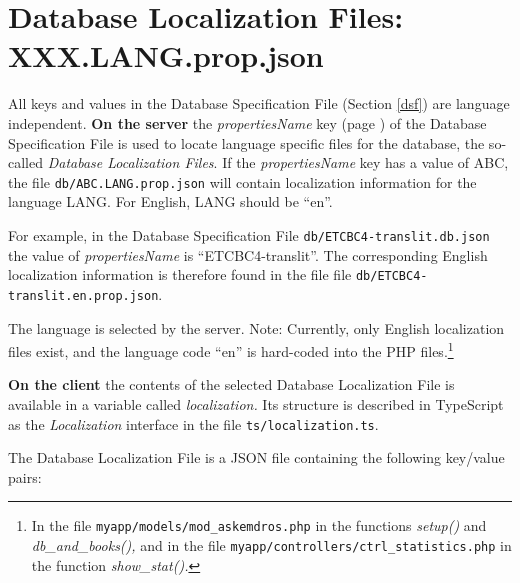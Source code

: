 \documentclass[11pt,oneside,a4paper]{memoir}
\begin{document}
\section{Database Localization Files: XXX.LANG.prop.json}\label{db-local}

All keys and values in the Database Specification File (Section \ref{dsf}) are language
independent. \textbf{On the server} the \emph{propertiesName} key (page \pageref{propname}) of the
Database Specification File is used to locate language specific files for the database, the
so-called \emph{Database Localization Files}. If the \emph{propertiesName} key has a value of ABC,
the file \texttt{db/ABC.LANG.prop.json} will contain localization information for the language LANG.
For English, LANG should be ``en''.

For example, in the Database Specification File \texttt{db/ETCBC4-translit.db.json} the value of
\emph{propertiesName} is ``ETCBC4-translit''. The corresponding English localization information is
therefore found in the file file \texttt{db/ETCBC4-translit.en.prop.json}.

The language is selected by the server. Note: Currently, only English localization files exist, and
the language code ``en'' is hard-coded into the PHP files.\footnote{In the file
  \texttt{myapp/models/mod\_askemdros.php} in the functions \emph{setup()} and
  \emph{db\_and\_books(),} and in the file \texttt{myapp/controllers/ctrl\_statistics.php} in the
  function \emph{show\_stat().}}

\textbf{On the client} the contents of the selected Database Localization File is available in a
variable called \emph{localization.} Its structure is described in TypeScript as the
\emph{Localization} interface in the file \texttt{ts/localization.ts}.

The Database Localization File is a JSON file containing the following key/value pairs:
\end{document}

